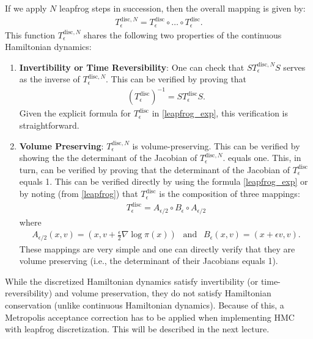 \documentclass{scrartcl}
\begin{document}
If we apply $N$ leapfrog steps in succession, then the overall mapping
is given by:
\begin{align*}
  T^{\text{disc}, N}_{\epsilon} = T_{\epsilon}^{\text{disc}} \circ \dots \circ
  T_{\epsilon}^{\text{disc}}. 
\end{align*}
This function $T^{\text{disc}, N}_{\epsilon}$ shares the following two properties of
the continuous Hamiltonian dynamics:
\begin{enumerate}
\item \textbf{Invertibility or Time Reversibility}: One can check that $S
  T_{\epsilon}^{\text{disc}, N} S$ serves as the inverse of
  $T_{\epsilon}^{\text{disc}, N}$. This can be verified by proving
  that
  \begin{align*}
    \left(T_{\epsilon}^{\text{disc}} \right)^{-1} = S
    T_{\epsilon}^{\text{disc}} S. 
  \end{align*}
  Given the explicit formula for $ T_{\epsilon}^{\text{disc}} $ in
  \eqref{leapfrog_exp}, this verification is straightforward.
\item \textbf{Volume Preserving}: $T_{\epsilon}^{\text{disc}, N}$ is
  volume-preserving. This can be verified by showing the the
  determinant of the Jacobian of $T_{\epsilon}^{\text{disc}, N}$.
  equals one. This, in turn, can be verified by proving that the
  determinant of the Jacobian of $T_{\epsilon}^{\text{disc}}$
  equals 1. This can be verified directly by using the formula
  \eqref{leapfrog_exp} or by noting (from \eqref{leapfrog}) that
  $T_{\epsilon}^{\text{disc}}$ is the composition of three mappings:
  \begin{align*}
    T_{\epsilon}^{\text{disc}} = A_{\epsilon/2} \circ B_{\epsilon}
    \circ A_{\epsilon/2}
  \end{align*}
  where
  \begin{align*}
    A_{\epsilon/2}(x, v) = \left(x, v + \frac{\epsilon}{2} \nabla \log
    \pi(x)\right) ~~ \text{ and } ~~ B_{\epsilon}(x, v) = (x +
    \epsilon v, v). 
  \end{align*}
  These mappings are very simple and one can directly verify that they
  are volume preserving (i.e., the determinant of their Jacobians
  equals 1). 
\end{enumerate}
While the discretized Hamiltonian dynamics satisfy invertibility (or
time-reversibility) and volume preservation, they do not satisfy
Hamiltonian conservation (unlike continuous Hamiltonian
dynamics). Because of this, a Metropolis acceptance correction has to
be applied when implementing HMC with leapfrog discretization. This
will be described in the next lecture. 
\end{document}
